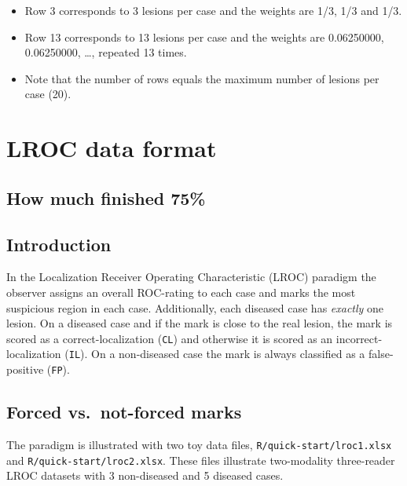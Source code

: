 \documentclass[
]{book}
\providecommand{\tightlist}{%
  \setlength{\itemsep}{0pt}\setlength{\parskip}{0pt}}
\begin{document}
\begin{itemize}
\tightlist
\item
  Row 3 corresponds to 3 lesions per case and the weights are 1/3, 1/3 and 1/3.
\item
  Row 13 corresponds to 13 lesions per case and the weights are 0.06250000, 0.06250000, \ldots, repeated 13 times.
\item
  Note that the number of rows equals the maximum number of lesions per case (20).
\end{itemize}

\hypertarget{quick-start-lroc}{%
\chapter{LROC data format}\label{quick-start-lroc}}

\hypertarget{quick-start-lroc-data-how-much-finished}{%
\section{How much finished 75\%}\label{quick-start-lroc-data-how-much-finished}}

\hypertarget{quick-start-lroc-data-intro}{%
\section{Introduction}\label{quick-start-lroc-data-intro}}

In the Localization Receiver Operating Characteristic (LROC) paradigm \citep{starr1977comments, starr1975visual, swensson1996unified} the observer assigns an overall ROC-rating to each case and marks the most suspicious region in each case. Additionally, each diseased case has \emph{exactly} one lesion. On a diseased case and if the mark is close to the real lesion, the mark is scored as a correct-localization (\texttt{CL}) and otherwise it is scored as an incorrect-localization (\texttt{IL}). On a non-diseased case the mark is always classified as a false-positive (\texttt{FP}).

\hypertarget{quick-start-lroc-data-forced-vs-not-forced}{%
\section{Forced vs.~not-forced marks}\label{quick-start-lroc-data-forced-vs-not-forced}}

The paradigm is illustrated with two toy data files, \texttt{R/quick-start/lroc1.xlsx} and \texttt{R/quick-start/lroc2.xlsx}. These files illustrate two-modality three-reader LROC datasets with 3 non-diseased and 5 diseased cases.
\end{document}

